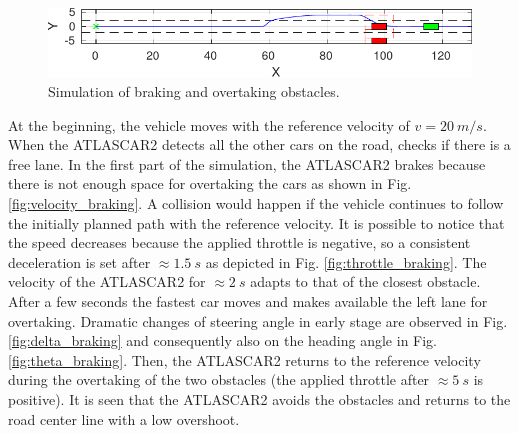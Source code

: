 \begin{figure}[!h]
\begin{minipage}[t]{\textwidth}
	\end{minipage}
	\begin{minipage}[t]{\textwidth}
		\includegraphics[width=\textwidth]{./figure/three_obstacles_no_overtaking/braking_6.pdf}
	\end{minipage}
	\caption{Simulation of braking and overtaking obstacles.}
	\label{fig:braking}
\end{figure}

At the beginning, the vehicle moves with the reference velocity of $v=\SI{20}{m/s}$. When the ATLASCAR2 detects all the other cars on the road, checks if there is a free lane. In the first part of the simulation, the ATLASCAR2 brakes because there is not enough space for overtaking the cars as shown in Fig. \ref{fig:velocity_braking}. A collision would happen if the vehicle continues to follow the initially planned path with the reference velocity. It is possible to notice that the speed decreases because the applied throttle is negative, so a consistent deceleration is set after $\approx\SI{1.5}{s}$ as depicted in Fig. \ref{fig:throttle_braking}. The velocity of the ATLASCAR2 for $\approx\SI{2}{s}$ adapts to that of the closest obstacle. After a few seconds the fastest car moves and makes available the left lane for overtaking. Dramatic changes of steering angle in early stage are observed in Fig. \ref{fig:delta_braking} and consequently also on the heading angle in Fig. \ref{fig:theta_braking}. Then, the ATLASCAR2 returns to the reference velocity during the overtaking of the two obstacles (the applied throttle after $\approx\SI{5}{s}$ is positive). It is seen that the ATLASCAR2 avoids the obstacles and returns to the road center line with a low overshoot.

